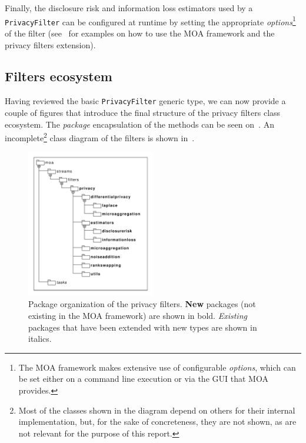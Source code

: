 Finally, the disclosure risk and information loss estimators used by a \texttt{PrivacyFilter} can be configured at runtime by setting the appropriate \textit{options}\footnote{The MOA framework makes extensive use of configurable \textit{options}, which can be set either on a command line execution or via the GUI that MOA provides.} of the filter (see~ for examples on how to use the MOA framework and the privacy filters extension).

\subsection{Filters ecosystem}
\label{Implementation:PrivacyFilter:Ecosystem}

Having reviewed the basic \texttt{PrivacyFilter} generic type, we can now provide a couple of figures that introduce the final structure of the privacy filters class ecosystem. The \textit{package} encapsulation of the methods can be seen on~. An incomplete\footnote{Most of the classes shown in the diagram depend on others for their internal implementation, but, for the sake of concreteness, they are not shown, as are not relevant for the purpose of this report.} class diagram of the filters is shown in~.

\begin{figure}
	\centering
	\includegraphics[width=0.5\textwidth]{figures/moa-ppsm-packages.pdf}
	\caption{Package organization of the privacy filters. \textbf{New} packages (not existing in the MOA framework) are shown in bold. \textit{Existing} packages that have been extended with new types are shown in italics.}
	\label{fig:moa-ppsm-packages}
\end{figure}

